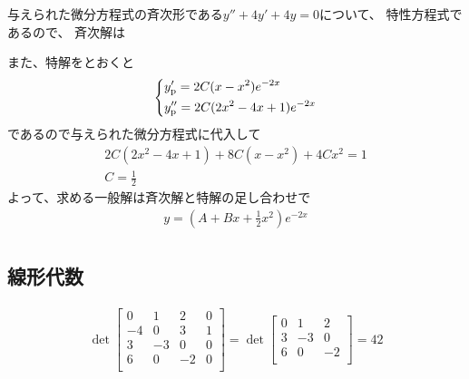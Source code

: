 \begin{ans*}
  与えられた微分方程式の斉次形である$y'' + 4y' + 4y = 0$について、
  特性方程式\mbox{}であるので、
  斉次解は

  また、特解をとおくと
  \begin{gather}
    \begin{dcases*}
      y'_{\rm{p}} = 2C(x-x^2)e^{-2x} \\
      y''_{\rm{p}}= 2C(2x^2-4x+1)e^{-2x}
    \end{dcases*}
  \end{gather}
  であるので与えられた微分方程式に代入して
  \begin{gather}
    2C(2x^2 - 4x + 1) + 8C(x-x^2) + 4Cx^2 = 1 \\
    C = \frac{1}{2} 
  \end{gather}
  よって、求める一般解は斉次解と特解の足し合わせで
  \begin{gather}
    y = \left(A + Bx + \frac{1}{2}x^2\right)e^{-2x} \\
  \end{gather}
\end{ans*}



\subsection{線形代数}
\begin{ans*}
  \begin{align}
    \det 
    \begin{bmatrix}
      0 & 1 & 2 & 0 \\
      -4 & 0 & 3 & 1 \\
      3 & -3 & 0 & 0 \\
      6 & 0 & -2 & 0 \\
    \end{bmatrix}
    = \det
    \begin{bmatrix}
      0  & 1  & 2  \\
      3  & -3 & 0  \\
      6  & 0  & -2 \\
    \end{bmatrix}
    = 42
  \end{align}
\end{ans*}

